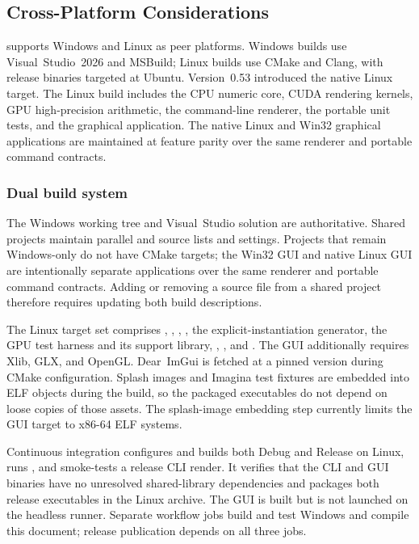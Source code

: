\subsection{Cross-Platform Considerations}
\label{sec:cross-platform}

\FractalShark{} supports Windows and Linux as peer platforms. Windows builds use
Visual~Studio~2026 and MSBuild; Linux builds use CMake and Clang, with release
binaries targeted at Ubuntu. Version~0.53 introduced the native Linux target.
The Linux build includes the CPU numeric core, CUDA rendering kernels, GPU
high-precision arithmetic, the command-line renderer, the portable unit tests,
and the  graphical application. The native Linux and
Win32 graphical applications are maintained at feature parity over the same
renderer and portable command contracts.

\subsubsection{Dual build system}
\label{subsec:dual-build}

The Windows working tree and Visual~Studio solution are authoritative. Shared
projects maintain parallel  and  source
lists and settings. Projects that remain Windows-only do not have CMake targets;
the Win32 GUI and native Linux GUI are intentionally separate applications over
the same renderer and portable command contracts. Adding or removing a source
file from a shared project therefore requires updating both build descriptions.

The Linux target set comprises ,
, ,
, the explicit-instantiation generator, the GPU test
harness and its support library, ,
, and . The GUI additionally
requires Xlib, GLX, and OpenGL. Dear~ImGui is fetched at a pinned version during
CMake configuration. Splash images and Imagina test fixtures are embedded into
ELF objects during the build, so the packaged executables do not depend on
loose copies of those assets. The splash-image embedding step currently limits
the GUI target to x86-64 ELF systems.

Continuous integration configures and builds both Debug and Release on Linux,
runs , and smoke-tests a release CLI render. It verifies
that the CLI and GUI binaries have no unresolved shared-library dependencies
and packages both release executables in the Linux archive. The GUI is built
but is not launched on the headless runner. Separate workflow jobs build and
test Windows and compile this document; release publication depends on all
three jobs.

